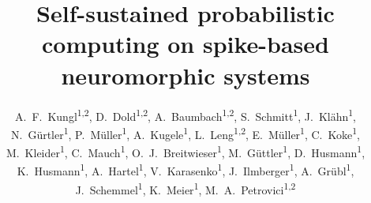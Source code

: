 \title{\LARGE Self-sustained probabilistic computing\linebreak{}  on spike-based neuromorphic systems} %

\author{\normalsize A.~F.~Kungl\textsuperscript{1,2}, D.~Dold\textsuperscript{1,2}, A.~Baumbach\textsuperscript{1,2}, S.~Schmitt\textsuperscript{1}, J.~Kl\"ahn\textsuperscript{1}, N.~G\"urtler\textsuperscript{1}, P.~M\"uller\textsuperscript{1},  A.~Kugele\textsuperscript{1}, L.~Leng\textsuperscript{1,2}, E.~M\"uller\textsuperscript{1}, C.~Koke\textsuperscript{1}, M.~Kleider\textsuperscript{1}, C.~Mauch\textsuperscript{1}, O.~J.~Breitwieser\textsuperscript{1}, M.~G\"uttler\textsuperscript{1}, D.~Husmann\textsuperscript{1}, K.~Husmann\textsuperscript{1}, A.~Hartel\textsuperscript{1}, V.~Karasenko\textsuperscript{1},  J.~Ilmberger\textsuperscript{1}, A.~Gr\"ubl\textsuperscript{1},  J.~Schemmel\textsuperscript{1}, K.~Meier\textsuperscript{1}, M.~A.~Petrovici\textsuperscript{1,2} } %



\newcommand{\leftfoot}{\url{http://www.kip.uni-heidelberg.de/vision/publications/}} %

\newcommand{\rightfoot}{fkungl@kip.uni-heidelberg.de} %


